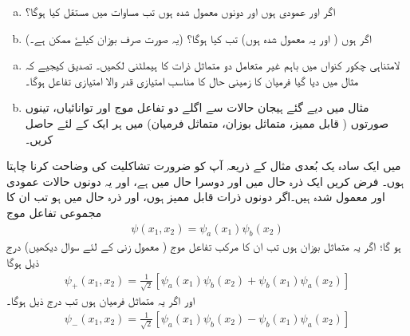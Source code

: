\begin{enumerate}[a.]
\item
اگر  اور   عمودی ہوں اور دونوں معمول شدہ ہوں تب مساوات    میں مستقل  کیا ہوگا؟ 
\item
اگر   ہوں ( اور یہ معمول شدہ ہوں)  تب    کیا ہوگا؟ (یہ صورت صرف بوزان کیلۓ ممکن ہے۔)
\end{enumerate}
\begin{enumerate}[a.]
\item
لامتناہی چکور کنواں میں باہم غیر متعامل دو متماثل ذرات کا ہیملٹنی لکھیں۔ تصدیق کیجیے کہ مثال    میں دیا گیا فرمیان کا زمینی حال   کا مناسب امتیازی قدر والا امتیازی تفاعل ہوگا۔ 
\item
مثال    میں دیے گئے ہیجان حالات سے اگلے دو  تفاعل موج اور توانائیاں،  تینوں صورتوں ( قابل ممیز، متماثل بوزان، متماثل فرمیان)   میں ہر ایک کے لئے  حاصل کریں۔
\end{enumerate}


میں ایک سادہ یک بُعدی مثال کے ذریعہ آپ کو ضرورت تشاکلیت کی وضاحت کرنا چاہتا ہوں۔ فرض کریں ایک  ذرہ حال  میں اور دوسرا حال  میں ہے،   اور یہ دونوں حالات عمودی اور معمول شدہ  ہیں۔اگر  دونوں  ذرات قابل ممیز ہوں،  اور ذرہ  حال  میں ہو تب ان کا مجموعی تفاعل موج
\begin{align}\label{مساوات_متماثل_مجموعی_تفاعل_موج_قابل_ممیز}
	\psi(x_1, x_2)=\psi_a(x_1)\psi_b(x_2)
\end{align}
ہو گا؛ اگر یہ متماثل بوزان ہوں تب ان کا مرکب تفاعل موج ( معمول زنی کے لئے   سوال   دیکھیں)  درج ذیل ہوگا
\begin{align}\label{مساوات_متماثل_مجموعی_تفاعل_موج_متماثل_بوزان}
	\psi_+(x_1, x_2) = \frac{1}{\sqrt{2}}[\psi_a(x_1)\psi_b(x_2)+\psi_b(x_1)\psi_a(x_2)]
\end{align}
اور اگر یہ متماثل فرمیان ہوں تب درج ذیل ہوگا۔
\begin{align}\label{مساوات_متماثل_مجموعی_تفاعل_موج_متماثل_فرمیان}
	\psi_-(x_1, x_2)=\frac{1}{\sqrt{2}}[\psi_a(x_1)\psi_b(x_2)-\psi_b(x_1)\psi_a(x_2)]
\end{align}

